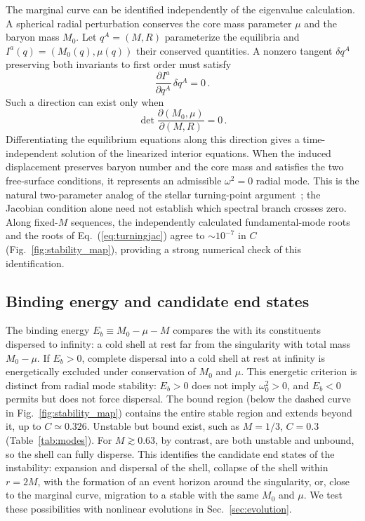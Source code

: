 \documentclass[%
 reprint,
 amsmath,amssymb,
 aps,prd,
 superscriptaddress,
]{revtex4-2}
\begin{document}
The marginal curve can be identified independently of the eigenvalue calculation. A spherical radial perturbation conserves the core mass parameter $\mu$ and the baryon mass $M_0$. Let $q^A=(M,R)$ parameterize the equilibria and $I^a(q)=(M_0(q),\mu(q))$ their conserved quantities. A nonzero tangent $\delta q^A$ preserving both invariants to first order must satisfy
\begin{equation}
\frac{\partial I^a}{\partial q^A}\,\delta q^A=0\,.
\end{equation}
Such a direction can exist only when
\begin{equation}
\det\frac{\partial(M_0,\mu)}{\partial(M,R)}=0\,.
\label{eq:turningjac}
\end{equation}
Differentiating the equilibrium equations along this direction gives a time-independent solution of the linearized interior equations. When the induced displacement preserves baryon number and the core mass and satisfies the two free-surface conditions, it represents an admissible $\omega^2=0$ radial mode. This is the natural two-parameter analog of the stellar turning-point argument~\cite{Sorkin1982,FriedmanIpserSorkin1988}; the Jacobian condition alone need not establish which spectral branch crosses zero. Along fixed-$M$ sequences, the independently calculated fundamental-mode roots and the roots of Eq.~(\ref{eq:turningjac}) agree to $\sim10^{-7}$ in $C$ (Fig.~\ref{fig:stability_map}), providing a strong numerical check of this identification.

\subsection{Binding energy and candidate end states}

The binding energy $E_b\equiv M_0-\mu-M$ compares the \singu{} with its constituents dispersed to infinity: a cold shell at rest far from the singularity with total mass $M_0-\mu$. If $E_b>0$, complete dispersal into a cold shell at rest at infinity is energetically excluded under conservation of $M_0$ and $\mu$. This energetic criterion is distinct from radial mode stability: $E_b>0$ does not imply $\omega_0^2>0$, and $E_b<0$ permits but does not force dispersal. The bound region (below the dashed curve in Fig.~\ref{fig:stability_map}) contains the entire stable region and extends beyond it, up to $C\simeq0.326$. Unstable but bound  exist, such as $M=1/3$, $C=0.3$ (Table~\ref{tab:modes}). For $M\gtrsim0.63$, by contrast,  are both unstable and unbound, so the shell can fully disperse. This identifies the candidate end states of the instability: expansion and dispersal of the shell, collapse of the shell within $r=2M$, with the formation of an event horizon around the singularity, or, close to the marginal curve, migration to a stable \singu{} with the same $M_0$ and $\mu$. We test these possibilities with nonlinear evolutions in Sec.~\ref{sec:evolution}.
\end{document}
